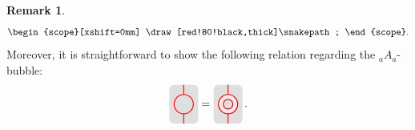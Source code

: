 \documentclass[12pt, reqno]{amsart}
\newcommand{\tikzmath}[2][]
{\vcenter{\hbox{\begin{tikzpicture}[#1]#2\end{tikzpicture}}}
}
\newcommand{\AsColor}{red}
\newcommand{\AColor}{lightgray!50}
\newcommand{\Asplitcolor}{red!10}
\newcommand{\XsColor}{red!80!black}
\theoremstyle{plain}
\theoremstyle{definition}
\newtheorem{rem}[thm]{Remark}
\begin{document}
\begin{rem}
\[{\begin{scope}[xshift=0mm]
        \draw[\XsColor,thick]\snakepath;
        \end{scope}
    }.
    \]
Moreover, it is straightforward to show the following relation regarding the ${}_aA_a$-bubble:
$$
\tikzmath{
    \tikzset{scale=0.3}
    \coordinate (O) at (0,0);
    \fill[\AColor,rounded corners] (O) rectangle ++(3,4);
    \draw[\AsColor,thick] (O) ++(1.5,0) -- ++(0,1);
    \draw[\AsColor,thick] (O) ++(1.5,3) -- ++(0,1);
    \draw[thick,fill=\AColor, draw=\AsColor](O)++(1.5,2) circle(1);
}
=
\tikzmath{
    \tikzset{scale=0.3}
    \coordinate (O) at (0,0);
    \fill[\AColor,rounded corners] (O) rectangle ++(3,4);
    \draw[\AsColor,thick] (O) ++(1.5,0) -- ++(0,1);
    \draw[\AsColor,thick] (O) ++(1.5,3) -- ++(0,1);
    \draw[thick,fill=\Asplitcolor, draw=\XsColor](O)++(1.5,2) circle(1);
    \draw[thick,fill=\AColor, draw=\XsColor](O)++(1.5,2) circle(.5);
}
\,.
$$
\end{rem}
\end{document}
